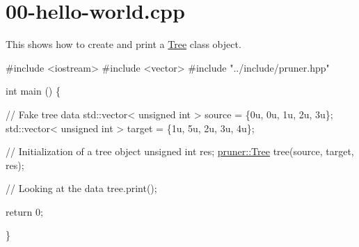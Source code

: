 \hypertarget{00-hello-world_8cpp-example}{}\section{00-\/hello-\/world.\+cpp}
This shows how to create and print a \hyperlink{classTree}{Tree} class object.


\begin{DoxyCodeInclude}
\textcolor{preprocessor}{#include <iostream>}
\textcolor{preprocessor}{#include <vector>}
\textcolor{preprocessor}{#include "../include/pruner.hpp"}

\textcolor{keywordtype}{int} main () \{
  
  \textcolor{comment}{// Fake tree data}
  std::vector< unsigned int > source = \{0u, 0u, 1u, 2u, 3u\};
  std::vector< unsigned int > target = \{1u, 5u, 2u, 3u, 4u\};

  \textcolor{comment}{// Initialization of a tree object}
  \textcolor{keywordtype}{unsigned} \textcolor{keywordtype}{int} res;
  \hyperlink{classpruner_1_1Tree}{pruner::Tree} tree(source, target, res);
  
  \textcolor{comment}{// Looking at the data}
  tree.print();         
  
  
  \textcolor{keywordflow}{return} 0;
  
\}
\end{DoxyCodeInclude}
 
